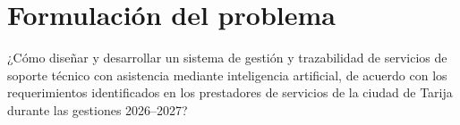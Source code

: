 \section{Formulación del problema}

¿Cómo diseñar y desarrollar un sistema de gestión y trazabilidad de servicios de soporte técnico con asistencia mediante inteligencia artificial, de acuerdo con los requerimientos identificados en los prestadores de servicios de la ciudad de Tarija durante las gestiones 2026--2027?